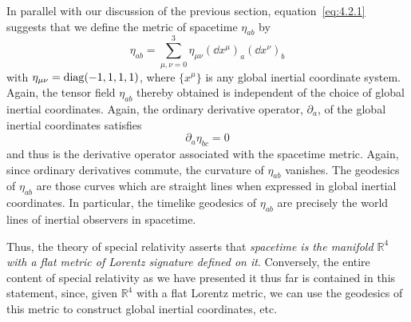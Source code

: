 In parallel with our discussion of the previous section,
equation~\eqref{eq:4.2.1} suggests that we define the metric of spacetime
\(\eta_{ab}\) by
\begin{equation}
  \eta_{ab}=\sum_{\mu,\nu=0}^{3}
  \eta_{\mu\nu}(\dd x^\mu)_a(\dd x^\nu)_b
  \tag{4.2.2}\label{eq:4.2.2}
\end{equation}
with \(\eta_{\mu\nu}=\operatorname{diag}(-1,1,1,1)\), where \(\{x^\mu\}\) is any
global inertial coordinate system. Again, the tensor field \(\eta_{ab}\) thereby
obtained is independent of the choice of global inertial coordinates. Again, the
ordinary derivative operator, \(\partial_a\), of the global inertial coordinates
satisfies
\begin{equation}
  \partial_a\eta_{bc}=0
  \tag{4.2.3}\label{eq:4.2.3}
\end{equation}
and thus is the derivative operator associated with the spacetime metric. Again,
since ordinary derivatives commute, the curvature of \(\eta_{ab}\) vanishes. The
geodesics of \(\eta_{ab}\) are those curves which are straight lines when
expressed in global inertial coordinates. In particular, the timelike geodesics of
\(\eta_{ab}\) are precisely the world lines of inertial observers in spacetime.

Thus, the theory of special relativity asserts that \emph{spacetime is the manifold
\(\mathbb R^4\) with a flat metric of Lorentz signature defined on it}.
Conversely, the entire content of special relativity as we have presented it thus
far is contained in this statement, since, given \(\mathbb R^4\) with a flat
Lorentz metric, we can use the geodesics of this metric to construct global inertial
coordinates, etc.

